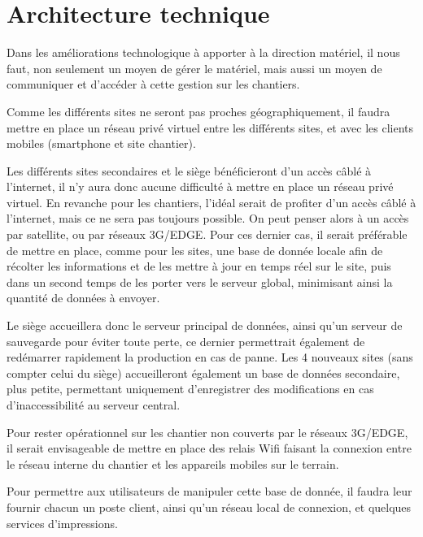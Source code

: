 \section{Architecture technique}

    Dans les améliorations technologique à apporter à la direction matériel, il nous faut, non seulement un moyen de gérer le matériel, mais aussi un moyen de communiquer et d'accéder à cette gestion sur les chantiers.

    Comme les différents sites ne seront pas proches géographiquement, il faudra mettre en place un réseau privé virtuel entre les différents sites, et avec les clients mobiles (smartphone et site chantier).

    Les différents sites secondaires et le siège bénéficieront d'un accès câblé à l'internet, il n'y aura donc aucune difficulté à mettre en place un réseau privé virtuel.
    En revanche pour les chantiers, l'idéal serait de profiter d'un accès câblé à l'internet, mais ce ne sera pas toujours possible. On peut penser alors à un accès par satellite, ou par réseaux 3G/EDGE. Pour ces dernier cas, il serait préférable de mettre en place, comme pour les sites, une base de donnée locale afin de récolter les informations et de les mettre à jour en temps réel sur le site, puis dans un second temps de les porter vers le serveur global, minimisant ainsi la quantité de données à envoyer.

    Le siège accueillera donc le serveur principal de données, ainsi qu'un serveur de sauvegarde pour éviter toute perte, ce dernier permettrait également de redémarrer rapidement la production en cas de panne. Les 4 nouveaux sites (sans compter celui du siège) accueilleront également un base de données secondaire, plus petite, permettant uniquement d'enregistrer des modifications en cas d'inaccessibilité au serveur central.

    Pour rester opérationnel sur les chantier non couverts par le réseaux 3G/EDGE, il serait envisageable de mettre en place des relais Wifi faisant la connexion entre le réseau interne du chantier et les appareils mobiles sur le terrain.

    Pour permettre aux utilisateurs de manipuler cette base de donnée, il faudra leur fournir chacun un poste client, ainsi qu'un réseau local de connexion, et quelques services d'impressions.


